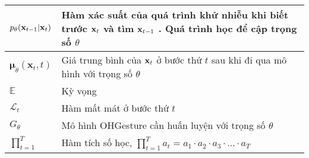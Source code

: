 \begin{center}
\begin{tabular}{|p{3cm}|p{11cm}|}
\hline
$p_{\theta} (\mathbf{x}_{t-1} | \mathbf{x}_{t})$ & Hàm xác suất của quá trình khử nhiễu khi biết trước $\mathbf{x}_{t}$ và tìm $\mathbf{x}_{t-1}$ . Quá trình học để cập trọng số $\theta$   \\
\hline
$\boldsymbol{\mu}_\theta(\mathbf{x}_t, t)$ & Giá trung bình của $\mathbf{x}_t$ ở bước thứ $t$ sau khi đi qua mô hình với trọng số $\theta$  \\
\hline
$\mathbb{E}$ & Kỳ vọng \\
\hline
$\mathcal{L}_t$ & Hàm mất mát ở bước thứ $t$ \\
\hline
$G_\theta$ & Mô hình OHGesture cần huấn luyện với trọng số $\theta$ \\
\hline
$\prod^T_{t=1}$ & Hàm tích số học, $\prod_{t=1}^T a_t = a_1 \cdot a_2 \cdot a_3 \cdot \ldots \cdot a_T$  \\
\hline


\end{tabular}
\end{center}


\pagebreak
